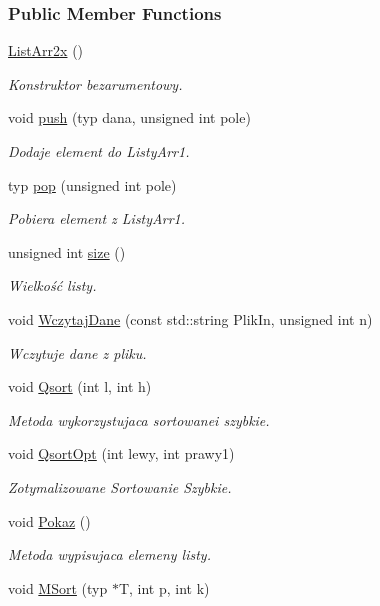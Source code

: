 \subsubsection*{Public Member Functions}
\begin{DoxyCompactItemize}
\item 
\hyperlink{class_list_arr2x_abcda8405dca802e050c32cadb56f2caf}{List\-Arr2x} ()
\begin{DoxyCompactList}\small\item\em Konstruktor bezarumentowy. \end{DoxyCompactList}\item 
void \hyperlink{class_list_arr2x_a6aa004e56bdaf72de719d682b4069011}{push} (typ dana, unsigned int pole)
\begin{DoxyCompactList}\small\item\em Dodaje element do Listy\-Arr1. \end{DoxyCompactList}\item 
typ \hyperlink{class_list_arr2x_a6462ac1f547b7a090e54629539ce2dda}{pop} (unsigned int pole)
\begin{DoxyCompactList}\small\item\em Pobiera element z Listy\-Arr1. \end{DoxyCompactList}\item 
unsigned int \hyperlink{class_list_arr2x_a6097d85211e74053506d4a5dce86f26c}{size} ()
\begin{DoxyCompactList}\small\item\em Wielkość listy. \end{DoxyCompactList}\item 
void \hyperlink{class_list_arr2x_afd6469fa733da21b70981fa4dfae9c12}{Wczytaj\-Dane} (const std\-::string Plik\-In, unsigned int n)
\begin{DoxyCompactList}\small\item\em Wczytuje dane z pliku. \end{DoxyCompactList}\item 
void \hyperlink{class_list_arr2x_a7145b66ae33801053dc15bad1baa3085}{Qsort} (int l, int h)
\begin{DoxyCompactList}\small\item\em Metoda wykorzystujaca sortowanei szybkie. \end{DoxyCompactList}\item 
void \hyperlink{class_list_arr2x_a0c4ff2329317ccd77e48cf2965c80d91}{Qsort\-Opt} (int lewy, int prawy1)
\begin{DoxyCompactList}\small\item\em Zotymalizowane Sortowanie Szybkie. \end{DoxyCompactList}\item 
void \hyperlink{class_list_arr2x_a5f2644455c4c3a1ee9f1752a74857241}{Pokaz} ()
\begin{DoxyCompactList}\small\item\em Metoda wypisujaca elemeny listy. \end{DoxyCompactList}\item 
void \hyperlink{class_list_arr2x_a68dc47d3f73dbe42364bf34bdb132d00}{M\-Sort} (typ $\ast$T, int p, int k)
\end{DoxyCompactItemize}
